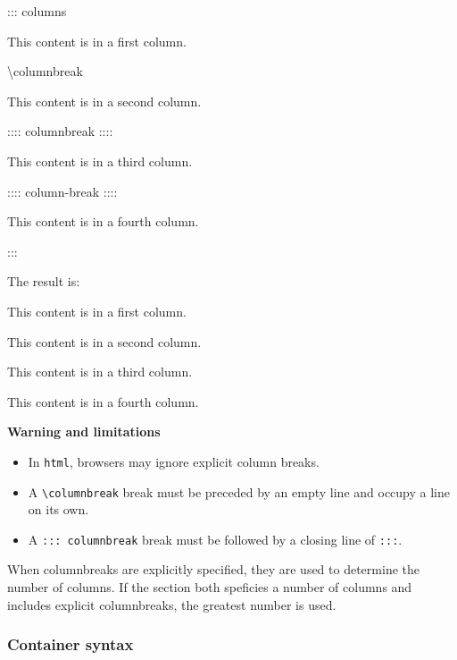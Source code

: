 \documentclass[
]{article}
\newenvironment{Shaded}{}{}
\newcommand{\NormalTok}[1]{#1}
\providecommand{\tightlist}{%
  \setlength{\itemsep}{0pt}\setlength{\parskip}{0pt}}
\begin{document}
\begin{Shaded}
\begin{Highlighting}[]
\NormalTok{::: columns}

\NormalTok{This content is in a first column.}

\NormalTok{\textbackslash{}columnbreak}

\NormalTok{This content is in a second column.}

\NormalTok{:::: columnbreak}
\NormalTok{::::}

\NormalTok{This content is in a third column.}

\NormalTok{:::: column{-}break}
\NormalTok{::::}

\NormalTok{This content is in a fourth column.}

\NormalTok{:::}
\end{Highlighting}
\end{Shaded}

The result is:

{\begin{multicols}{4}

This content is in a first column.

\columnbreak

This content is in a second column.

\columnbreak

This content is in a third column.

\columnbreak

This content is in a fourth column.

\end{multicols}
}

\textbf{Warning and limitations}

\begin{itemize}
\tightlist
\item
  In \texttt{html}, browsers may ignore explicit column breaks.
\item
  A \texttt{\textbackslash{}columnbreak} break must be preceded by an
  empty line and occupy a line on its own.
\item
  A \texttt{:::\ columnbreak} break must be followed by a closing line
  of \texttt{:::}.
\end{itemize}

When columnbreaks are explicitly specified, they are used to determine
the number of columns. If the section both speficies a number of columns
and includes explicit columnbreaks, the greatest number is used.

\hypertarget{container-syntax}{%
\subsubsection{Container syntax}\label{container-syntax}}
\end{document}
